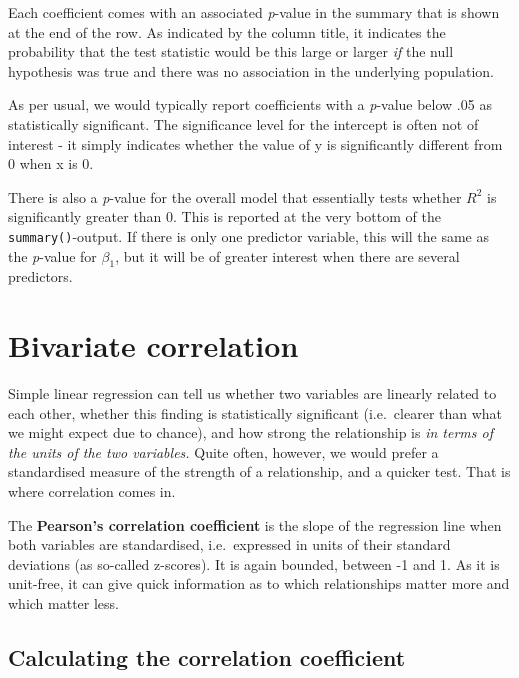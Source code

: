 \documentclass[
]{book}
\begin{document}
Each coefficient comes with an associated \emph{p}-value in the summary that
is shown at the end of the row. As indicated by the column title, it
indicates the probability that the test statistic would be this large or
larger \emph{if} the null hypothesis was true and there was no association in
the underlying population.

As per usual, we would typically report coefficients with a \emph{p}-value
below .05 as statistically significant. The significance level for the
intercept is often not of interest - it simply indicates whether the
value of y is significantly different from 0 when x is 0.

There is also a \emph{p}-value for the overall model that essentially tests
whether \(R^2\) is significantly greater than 0. This is reported at the
very bottom of the \texttt{summary()}-output. If there is only one predictor
variable, this will the same as the \emph{p}-value for \(\beta_{1}\), but it
will be of greater interest when there are several predictors.

\hypertarget{bivariate-correlation}{%
\section{Bivariate correlation}\label{bivariate-correlation}}

Simple linear regression can tell us whether two variables are linearly
related to each other, whether this finding is statistically significant
(i.e.~clearer than what we might expect due to chance), and how strong
the relationship is \emph{in terms of the units of the two variables.} Quite
often, however, we would prefer a standardised measure of the strength
of a relationship, and a quicker test. That is where correlation comes
in.

The \textbf{Pearson's correlation coefficient} is the slope of the regression
line when both variables are standardised, i.e.~expressed in units of
their standard deviations (as so-called z-scores). It is again bounded,
between -1 and 1. As it is unit-free, it can give quick information as
to which relationships matter more and which matter less.

\hypertarget{calculating-the-correlation-coefficient}{%
\subsection{Calculating the correlation coefficient}\label{calculating-the-correlation-coefficient}}
\end{document}
